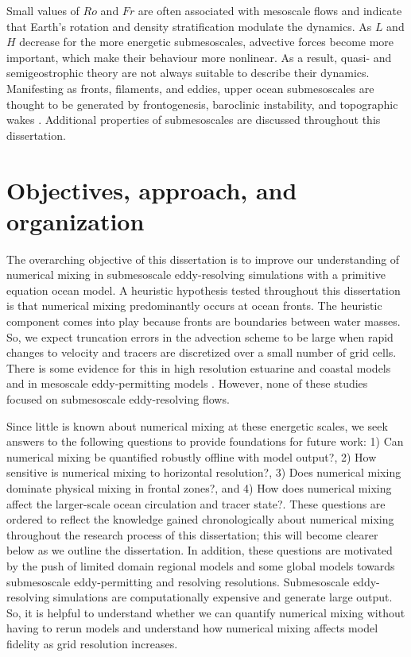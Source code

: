 Small values of $Ro$ and $Fr$ are often associated with mesoscale flows and indicate that Earth's rotation and density stratification modulate the dynamics. As $L$ and $H$ decrease for the more energetic submesoscales, advective forces become more important, which make their behaviour more nonlinear. As a result, quasi- and semigeostrophic theory are not always suitable to describe their dynamics. Manifesting as fronts, filaments, and eddies, upper ocean submesoscales are thought to be generated by frontogenesis, baroclinic instability, and topographic wakes \citep{mcwilliams2019survey, taylor2023submesoscale}. Additional properties of submesoscales are discussed throughout this dissertation. 

\section{Objectives, approach, and organization} \label{sec:diss_obj}
The overarching objective of this dissertation is to improve our understanding of numerical mixing in submesoscale eddy-resolving simulations with a primitive equation ocean model. A heuristic hypothesis tested throughout this dissertation is that numerical mixing predominantly occurs at ocean fronts. The heuristic component comes into play because fronts are boundaries between water masses. So, we expect truncation errors in the advection scheme to be large when rapid changes to velocity and tracers are discretized over a small number of grid cells. There is some evidence for this in high resolution estuarine and coastal models \citep{Broatch_2022, Kalra_2019, Ralston_2017, wang2021structure} and in mesoscale eddy-permitting models \citep{Holmes_2021, megann2022assessment}. However, none of these studies focused on submesoscale eddy-resolving flows. 

Since little is known about numerical mixing at these energetic scales, we seek answers to the following questions to provide foundations for future work: 1) Can numerical mixing be quantified robustly offline with model output?, 2) How sensitive is numerical mixing to horizontal resolution?, 3) Does numerical mixing dominate physical mixing in frontal zones?, and 4) How does numerical mixing affect the larger-scale ocean circulation and tracer state?. These questions are ordered to reflect the knowledge gained chronologically about numerical mixing throughout the research process of this dissertation; this will become clearer below as we outline the dissertation. In addition, these questions are motivated by the push of limited domain regional models and some global models towards submesoscale eddy-permitting and resolving resolutions. Submesoscale eddy-resolving simulations are computationally expensive and generate large output. So, it is helpful to understand whether we can quantify numerical mixing without having to rerun models and understand how numerical mixing affects model fidelity as grid resolution increases.

